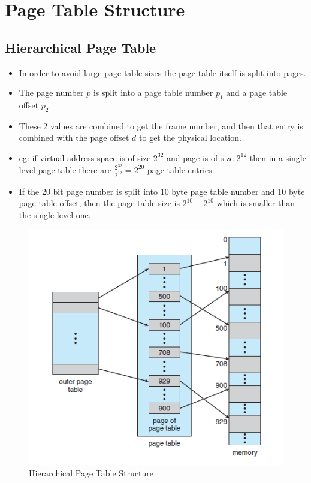 \documentclass{article}
\theoremstyle{plain}
\theoremstyle{definition}
\begin{document}
\section{Page Table Structure}
\subsection{Hierarchical Page Table}
\begin{itemize}
    \item In order to avoid large page table sizes the page table itself is split into pages. 
    
    \item The page number $p$ is split into a page table number $p_1$ and a page table offset $p_2$. 
    
    \item These 2 values are combined to get the frame number, and then that entry is combined with the page offset $d$ to get the physical location.
    
    \item eg: if virtual address space is of size $2^{32}$ and page is of size $2^{12}$ then in a single level page table there are $\frac{2^{32}}{2^{12}} = 2^{20}$ page table entries.
    
    \item If the 20 bit page number is split into 10 byte page table number and 10 byte page table offset, then the page table size is $2^{10} + 2^{10}$ which is smaller than the single level one. 
\end{itemize}
\begin{figure}[!ht]
    \centering
    \includegraphics[scale=0.9]{os7.png}
    \caption{Hierarchical Page Table Structure}
    \label{fig:my_label_7}
\end{figure}
\end{document}
